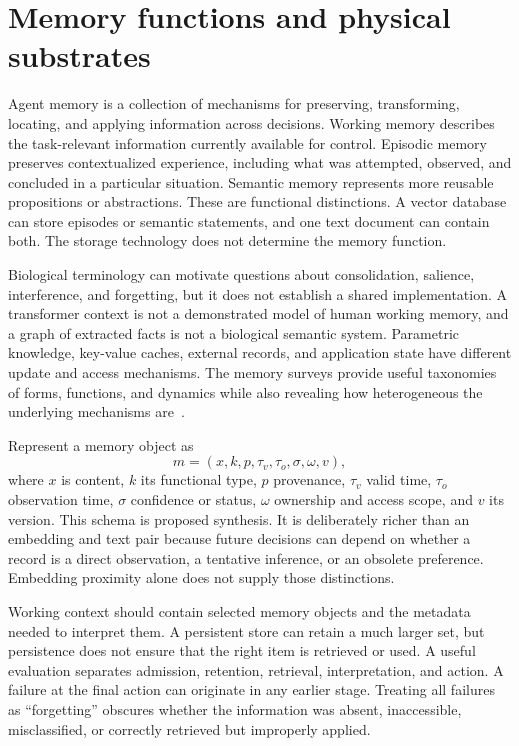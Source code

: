 \section{Memory functions and physical substrates}\label{sec:C14:taxonomy}
Agent memory is a collection of mechanisms for preserving, transforming, locating, and applying information across decisions. Working memory describes the task-relevant information currently available for control. Episodic memory preserves contextualized experience, including what was attempted, observed, and concluded in a particular situation. Semantic memory represents more reusable propositions or abstractions. These are functional distinctions. A vector database can store episodes or semantic statements, and one text document can contain both. The storage technology does not determine the memory function.

Biological terminology can motivate questions about consolidation, salience, interference, and forgetting, but it does not establish a shared implementation. A transformer context is not a demonstrated model of human working memory, and a graph of extracted facts is not a biological semantic system. Parametric knowledge, key-value caches, external records, and application state have different update and access mechanisms. The memory surveys provide useful taxonomies of forms, functions, and dynamics while also revealing how heterogeneous the underlying mechanisms are~\cite{corpus251213564,corpus260206052}.

Represent a memory object as
\begin{equation}
 m=(x,k,p,\tau_v,\tau_o,\sigma,\omega,v),
\end{equation}
where $x$ is content, $k$ its functional type, $p$ provenance, $\tau_v$ valid time, $\tau_o$ observation time, $\sigma$ confidence or status, $\omega$ ownership and access scope, and $v$ its version. This schema is proposed synthesis. It is deliberately richer than an embedding and text pair because future decisions can depend on whether a record is a direct observation, a tentative inference, or an obsolete preference. Embedding proximity alone does not supply those distinctions.

Working context should contain selected memory objects and the metadata needed to interpret them. A persistent store can retain a much larger set, but persistence does not ensure that the right item is retrieved or used. A useful evaluation separates admission, retention, retrieval, interpretation, and action. A failure at the final action can originate in any earlier stage. Treating all failures as ``forgetting'' obscures whether the information was absent, inaccessible, misclassified, or correctly retrieved but improperly applied.

